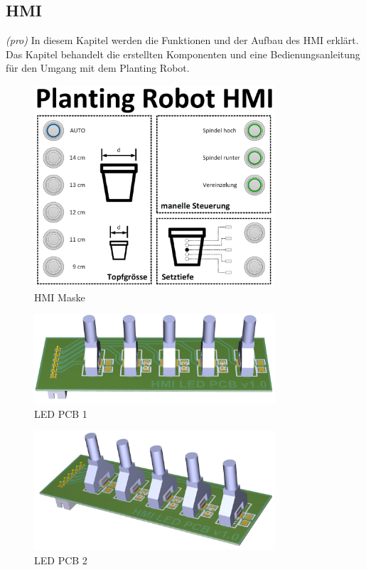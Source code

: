 \subsection{HMI} \label{sec:HMI}
\textit{(pro)} In diesem Kapitel werden die Funktionen und der Aufbau des HMI erklärt. Das Kapitel behandelt die erstellten Komponenten und eine Bedienungsanleitung für den Umgang mit dem Planting Robot.


\begin{figure}[H]
	\includegraphics[width=0.8\textwidth]{Illustrationen/6-Umsetzung/HMI_Maske.png}
	\caption{HMI Maske}
	\label{fig:HMI_Maske}
\end{figure}

\begin{figure}[H]
	\includegraphics[width=0.8\textwidth]{Illustrationen/6-Umsetzung/LED_PCB_3D.png}
	\caption{LED PCB 1}
	\label{fig:LED_PCB_1}
\end{figure}

\begin{figure}[H]
	\includegraphics[width=0.8\textwidth]{Illustrationen/6-Umsetzung/LED_PCB_3D_2.png}
	\caption{LED PCB 2}
	\label{fig:LED_PCB_2}
\end{figure}